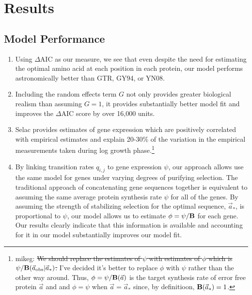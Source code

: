 \documentclass{article}
\newcommand{\DeltaAIC}{\ensuremath{\Delta\text{AIC}}\xspace}
\newcommand{\Funcaobsvec}{\ensuremath{\Func(\aobsvec|\aoptvec)}\xspace}
\newcommand{\Func}{\ensuremath{\text{\textbf{B}}}\xspace}
\newcommand{\aobsvec}{\ensuremath{\Vec{a}_{\text{obs}}}\xspace}
\newcommand{\aoptvec}{\ensuremath{\Vec{a}_*}\xspace}
\newcommand{\avec}{\ensuremath{\Vec{a}}\xspace}
\newcommand{\qij}{\ensuremath{q_{i,j}}\xspace}
\begin{document}
\section*{Results}
\subsection*{Model Performance}
\begin{enumerate}
\item Using \DeltaAIC as our measure, we see that even despite the need for estimating the optimal amino acid at each position in each protein, our model performs astronomically better than GTR, GY94, or YN08.
\item Including the random effects term $G$ not only provides greater biological realism than assuming $G =1$, it provides substantially better model fit and improves the \DeltaAIC score by over 16,000 units.




\item Selac provides estimates of gene expression which are positively correlated with empirical estimates and explain 20-30\% of the variation in the empirical measurements taken during log growth phase.\footnote{mikeg: \sout{We should replace the estimates of $\psi$ with estimates of $\phi$ which is $\psi/\Funcaobsvec$.}
I've decided it's better to replace $\phi$ with $\psi$ rather than the other way around.
Thus, $\phi = \psi/\Func(\avec)$ is the target synthesis rate of error free protein $\avec$ and and $\phi = \psi$ when  $\avec = \aoptvec$ since, by definitioon, $\Func(\aoptvec) = 1$.
}

\item By linking transition rates $\qij$ to gene expression $\psi$, our approach allows use the same model for genes under varying degrees of purifying selection.
The traditional approach of concatenating gene sequences together is equivalent to assuming the same average protein synthesis rate $\psi$ for all of the genes.
By assuming the strength of stabilizing selection for the optimal sequence, \aoptvec, is proportional to $\psi$,  our model allows us to estimate $\phi = \psi/\Func$ for each gene.
Our results clearly indicate that this information is available and accounting for it in our model substantially improves our model fit.

\end{enumerate}
\end{document}
